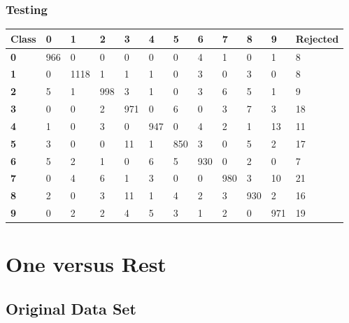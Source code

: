 \documentclass[
  a4paper,            %
  DIV=10,             %
  oneside,            %
  BCOR=5mm,           %
  parskip=half,       %
  numbers=noenddot,   %
  bibtotoc,           %
  listof=totoc,        %
  article
]{scrreprt}
\begin{document}
\subsubsection{Testing}
\begin{center}
  \begin{tabular}{|p{1cm}|p{1cm}|p{1cm}|p{1cm}|p{1cm}|p{1cm}|p{1cm}|p{1cm}|p{1cm}|p{1cm}|p{1cm}|p{1.7cm}|}
    \hline
    \textbf{Class} & \textbf{0} & \textbf{1} & \textbf{2} & \textbf{3} & \textbf{4} & \textbf{5} & \textbf{6} & \textbf{7} & \textbf{8} & \textbf{9} & \textbf{Rejected} \\
    \hline
    \textbf{0} & 966 & 0 & 0 & 0 & 0 & 0 & 4 & 1 & 0 & 1 & 8 \\
    \hline
    \textbf{1} & 0 & 1118 & 1 & 1 & 1 & 0 & 3 & 0 & 3 & 0 & 8 \\
    \hline
    \textbf{2} & 5 & 1 & 998 & 3 & 1 & 0 & 3 & 6 & 5 & 1 & 9 \\
    \hline
    \textbf{3} & 0 & 0 & 2 & 971 & 0 & 6 & 0 & 3 & 7 & 3 & 18 \\
    \hline
    \textbf{4} & 1 & 0 & 3 & 0 & 947 & 0 & 4 & 2 & 1 & 13 & 11 \\
    \hline
    \textbf{5} & 3 & 0 & 0 & 11 & 1 & 850 & 3 & 0 & 5 & 2 & 17 \\
    \hline
    \textbf{6} & 5 & 2 & 1 & 0 & 6 & 5 & 930 & 0 & 2 & 0 & 7 \\
    \hline
    \textbf{7} & 0 & 4 & 6 & 1 & 3 & 0 & 0 & 980 & 3 & 10 & 21 \\
    \hline
    \textbf{8} & 2 & 0 & 3 & 11 & 1 & 4 & 2 & 3 & 930 & 2 & 16 \\
    \hline
    \textbf{9} & 0 & 2 & 2 & 4 & 5 & 3 & 1 & 2 & 0 & 971 & 19 \\
    \hline
  \end{tabular}
\end{center}
\section{One versus Rest}
\subsection{Original Data Set}
\end{document}
